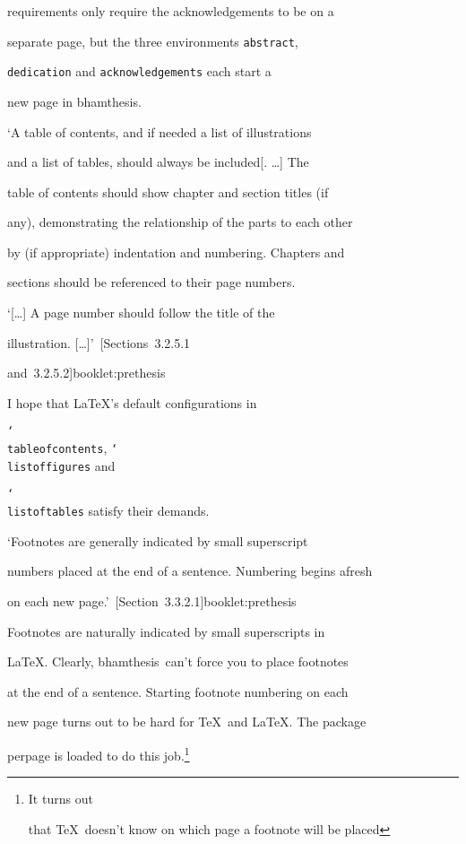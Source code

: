 \documentclass{bhamthesis}
\makeatletter
\renewcommand{\cite}{\@ifstar{\@ifstar{\HAR@acite}{\HAR@fcite}}{\HAR@acite}}
\newcommand{\solnmark}{\textasteriskcentered}
\newcommand{\req}{\begin{singlespace}\small\item}
\newcommand{\soln}{\end{singlespace}\normalsize\item[\solnmark]}
\newcommand{\clsname}{\pkg{bhamthesis}}
\newcommand{\bksl}{\char`\\}
\newcommand{\cmd}[1]{\texttt{\bksl{}#1}}
\newcommand{\pkg}[1]{\textsf{#1}}
\newcommand{\env}[1]{\texttt{#1}}
\makeatother
\begin{document}
\begin{itemize}
  requirements only require the acknowledgements to be on a

  separate page, but the three environments \env{abstract},

  \env{dedication} and \env{acknowledgements} each start a

  new page in \clsname.



\req `A table of contents, and if needed a list of illustrations

  and a list of tables, should always be included[. \ldots]  The

  table of contents should show chapter and section titles (if

  any), demonstrating the relationship of the parts to each other

  by (if appropriate) indentation and numbering. Chapters and

  sections should be referenced to their page numbers.



  `[\ldots]  A page number should follow the title of the

  illustration.  [\ldots]'~\cite[Sections~3.2.5.1

  and~3.2.5.2]{booklet:prethesis}

\soln I hope that \LaTeX's default configurations in

  \cmd{tableofcontents}, \cmd{listoffigures} and

  \cmd{listoftables} satisfy their demands.



\req `Footnotes are generally indicated by small superscript

  numbers placed at the end of a sentence.  Numbering begins afresh

  on each new page.'~\cite[Section~3.3.2.1]{booklet:prethesis}

\soln Footnotes are naturally indicated by small superscripts in

  \LaTeX.  Clearly, \clsname\ can't force you to place footnotes

  at the end of a sentence.  Starting footnote numbering on each

  new page turns out to be hard for \TeX\ and \LaTeX.  The package

  \pkg{perpage} is loaded to do this job.\footnote{It turns out

  that \TeX\ doesn't know on which page a footnote will be placed

}
\end{itemize}
\end{document}
